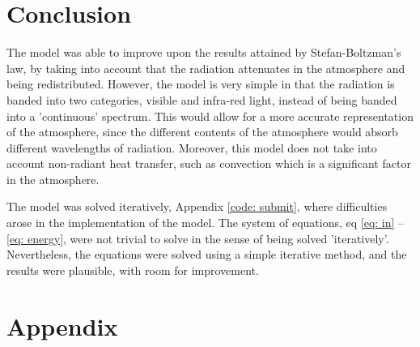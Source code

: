 \documentclass[a4paper]{article}
\newcommand{\newparagraph}{\vspace{.5cm}\noindent}
\begin{document}
\section{Conclusion}
The model was able to improve upon the results attained by Stefan-Boltzman's law, by taking into account that the radiation attenuates in the atmosphere and being redistributed.
However, the model is very simple in that the radiation is banded into two categories, visible and infra-red light, instead of being banded into a 'continuous' spectrum.
This would allow for a more accurate representation of the atmosphere, since the different contents of the atmosphere would absorb different wavelengths of radiation.
Moreover, this model does not take into account non-radiant heat transfer, such as convection which is a significant factor in the atmosphere.

\newparagraph
The model was solved iteratively, Appendix \ref{code: submit}, where difficulties arose in the implementation of the model.
The system of equations, eq \eqref{eq: in} -- \eqref{eq: energy}, were not trivial to solve in the sense of being solved 'iteratively'.
Nevertheless, the equations were solved using a simple iterative method, and the results were plausible, with room for improvement.

\printbibliography

\newpage
\section{Appendix}

\end{document}
